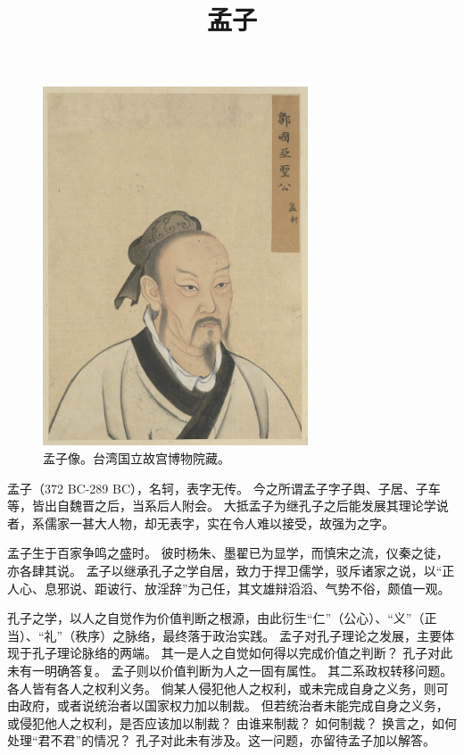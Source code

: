 \documentclass[11pt]{article}
\title{孟子}
\date{}
\begin{document}
  \maketitle
  
  \begin{figure}[H]
    \centering
    \includegraphics[width=0.7\textwidth]{../Figures/MengZi.jpg}
    \caption{孟子像。台湾国立故宫博物院藏。}
  \end{figure}

  \newpage
  
  \linenumbers

孟子（372 BC-289 BC），名轲，表字无传。
今之所谓孟子字子舆、子居、子车等，皆出自魏晋之后，当系后人附会。
大抵孟子为继孔子之后能发展其理论学说者，系儒家一甚大人物，却无表字，实在令人难以接受，故强为之字。

\newline

孟子生于百家争鸣之盛时。
彼时杨朱、墨翟已为显学，而慎宋之流，仪秦之徒，亦各肆其说。
孟子以继承孔子之学自居，致力于捍卫儒学，驳斥诸家之说，以“正人心、息邪说、距诐行、放淫辞”为己任，其文雄辩滔滔、气势不俗，颇值一观。

\newline

孔子之学，以人之自觉作为价值判断之根源，由此衍生“仁”（公心）、“义”（正当）、“礼”（秩序）之脉络，最终落于政治实践。
孟子对孔子理论之发展，主要体现于孔子理论脉络的两端。
其一是人之自觉如何得以完成价值之判断？
孔子对此未有一明确答复。
孟子则以价值判断为人之一固有属性。
其二系政权转移问题。
各人皆有各人之权利义务。
倘某人侵犯他人之权利，或未完成自身之义务，则可由政府，或者说统治者以国家权力加以制裁。
但若统治者未能完成自身之义务，或侵犯他人之权利，是否应该加以制裁？
由谁来制裁？
如何制裁？
换言之，如何处理“君不君”的情况？
孔子对此未有涉及。这一问题，亦留待孟子加以解答。
  
\end{document}
